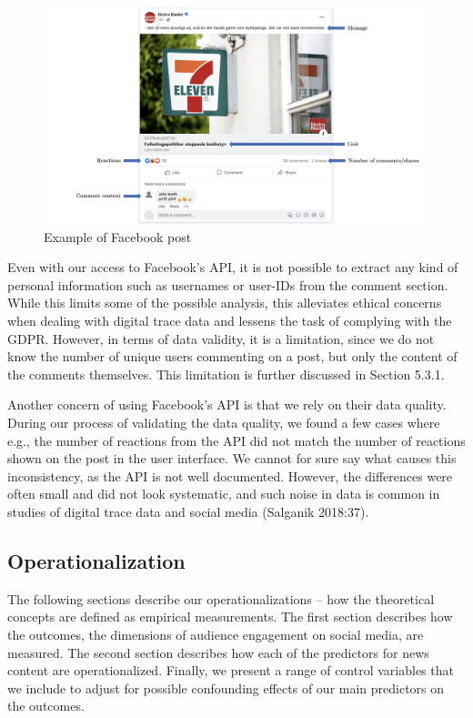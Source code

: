 \documentclass[
]{article}
\begin{document}
\begin{figure}[H]

{\centering \includegraphics[width=0.8\linewidth]{images/facebook_post} 

}

\caption{Example of Facebook post}\label{fig:post_example}
\end{figure}

Even with our access to Facebook's API, it is not possible to extract
any kind of personal information such as usernames or user-IDs from the
comment section. While this limits some of the possible analysis, this
alleviates ethical concerns when dealing with digital trace data and
lessens the task of complying with the GDPR. However, in terms of data
validity, it is a limitation, since we do not know the number of unique
users commenting on a post, but only the content of the comments
themselves. This limitation is further discussed in Section 5.3.1.

Another concern of using Facebook's API is that we rely on their data
quality. During our process of validating the data quality, we found a
few cases where e.g., the number of reactions from the API did not match
the number of reactions shown on the post in the user interface. We
cannot for sure say what causes this inconsistency, as the API is not
well documented. However, the differences were often small and did not
look systematic, and such noise in data is common in studies of digital
trace data and social media (Salganik 2018:37).

\hypertarget{operationalization}{%
\subsection{Operationalization}\label{operationalization}}

The following sections describe our operationalizations -- how the
theoretical concepts are defined as empirical measurements. The first
section describes how the outcomes, the dimensions of audience
engagement on social media, are measured. The second section describes
how each of the predictors for news content are operationalized.
Finally, we present a range of control variables that we include to
adjust for possible confounding effects of our main predictors on the
outcomes.
\end{document}
